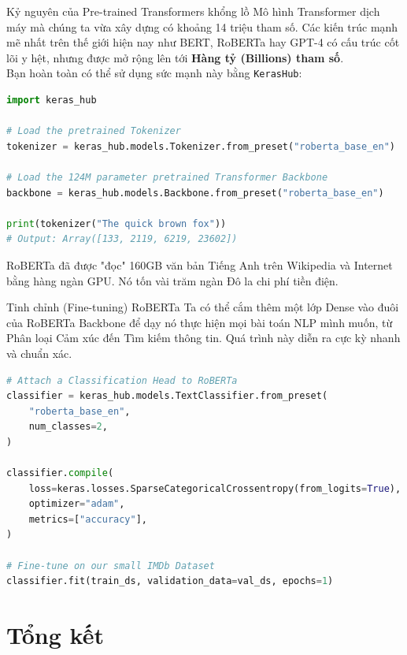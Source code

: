 \documentclass[aspectratio=169]{beamer}
\begin{document}
\begin{frame}[fragile]{Kỷ nguyên của Pre-trained Transformers khổng lồ}
Mô hình Transformer dịch máy mà chúng ta vừa xây dựng có khoảng 14 triệu tham số. Các kiến trúc mạnh mẽ nhất trên thế giới hiện nay như BERT, RoBERTa hay GPT-4 có cấu trúc cốt lõi y hệt, nhưng được mở rộng lên tới \textbf{Hàng tỷ (Billions) tham số}.
\\ \vspace{0.3cm}
Bạn hoàn toàn có thể sử dụng sức mạnh này bằng \texttt{KerasHub}:
\begin{lstlisting}[language=Python]
import keras_hub

# Load the pretrained Tokenizer
tokenizer = keras_hub.models.Tokenizer.from_preset("roberta_base_en")

# Load the 124M parameter pretrained Transformer Backbone
backbone = keras_hub.models.Backbone.from_preset("roberta_base_en")

print(tokenizer("The quick brown fox"))
# Output: Array([133, 2119, 6219, 23602])
\end{lstlisting}
RoBERTa đã được "đọc" 160GB văn bản Tiếng Anh trên Wikipedia và Internet bằng hàng ngàn GPU. Nó tốn vài trăm ngàn Đô la chi phí tiền điện.
\end{frame}

\begin{frame}[fragile]{Tinh chỉnh (Fine-tuning) RoBERTa}
Ta có thể cắm thêm một lớp Dense vào đuôi của RoBERTa Backbone để dạy nó thực hiện mọi bài toán NLP mình muốn, từ Phân loại Cảm xúc đến Tìm kiếm thông tin. Quá trình này diễn ra cực kỳ nhanh và chuẩn xác.
\begin{lstlisting}[language=Python]
# Attach a Classification Head to RoBERTa
classifier = keras_hub.models.TextClassifier.from_preset(
    "roberta_base_en",
    num_classes=2,
)

classifier.compile(
    loss=keras.losses.SparseCategoricalCrossentropy(from_logits=True),
    optimizer="adam",
    metrics=["accuracy"],
)

# Fine-tune on our small IMDb Dataset
classifier.fit(train_ds, validation_data=val_ds, epochs=1)
\end{lstlisting}
\end{frame}

\section{Tổng kết}
\end{document}
